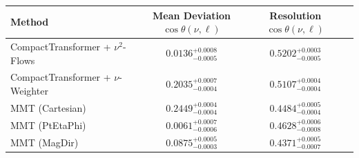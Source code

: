     \begin{tabular}{lccc}
        \toprule
        Method & Mean Deviation $\cos\theta(\nu, \ell)$ & Resolution $\cos\theta(\nu, \ell)$ \\
        \midrule
        CompactTransformer + $\nu^2$-Flows & $0.0136^{+0.0008}_{-0.0005}$ & $0.5202^{+0.0003}_{-0.0005}$ \\
        CompactTransformer + $\nu$-Weighter & $0.2035^{+0.0007}_{-0.0004}$ & $0.5107^{+0.0004}_{-0.0004}$ \\
        MMT (Cartesian) & $0.2449^{+0.0004}_{-0.0004}$ & $0.4484^{+0.0005}_{-0.0004}$ \\
        MMT (PtEtaPhi) & $0.0061^{+0.0007}_{-0.0006}$ & $0.4628^{+0.0006}_{-0.0008}$ \\
        MMT (MagDir) & $0.0875^{+0.0005}_{-0.0003}$ & $0.4371^{+0.0005}_{-0.0007}$ \\
        \bottomrule
    \end{tabular}
